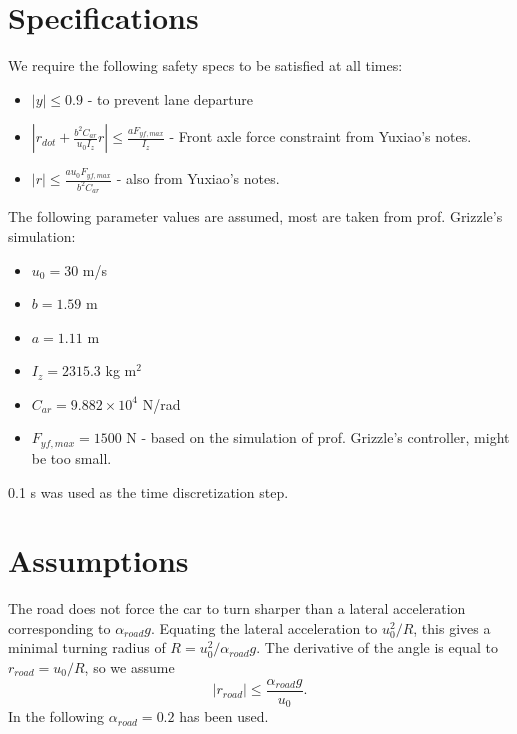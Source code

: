 \documentclass[letterpaper, 12pt]{article}
\begin{document}
\section{Specifications} %
\label{sec:specifications}

We require the following safety specs to be satisfied at all times:
\begin{itemize}
	\item $|y| \leq 0.9$ - to prevent lane departure
	\item $\left|r_{dot} + \frac{b^2 C_{ar}}{u_0 I_z} r \right|  \leq  \frac{a F_{yf,max}}{I_z}$ - Front axle force constraint from Yuxiao's notes.
	\item $| r | \leq \frac{a u_0 F_{yf,max} }{ b^2 C_{ar}}$ - also from Yuxiao's notes.
\end{itemize}

The following parameter values are assumed, most are taken from prof. Grizzle's simulation:
\begin{itemize}
	\item $u_0 = 30$ m/s
	\item $b = 1.59$ m
	\item $a = 1.11$ m
	\item $I_z = 2315.3$ kg m$^2$
	\item $C_{ar} = 9.882 \times 10^{4}$ N/rad
	\item $F_{yf,max} = 1500$ N - based on the simulation of prof. Grizzle's controller, might be too small.
\end{itemize}

0.1 s was used as the time discretization step.

\section{Assumptions} %
\label{sec:assumptions}

The road does not force the car to turn sharper than a lateral acceleration corresponding to $\alpha_{road} g$. Equating the lateral acceleration to $u_0^2/R$, this gives a minimal turning radius of $R = u_0^2/\alpha_{road} g$. The derivative of the angle is equal to $r_{road} = u_0/R$, so we assume
\begin{equation}
	|r_{road}| \leq \frac{ \alpha_{road} g}{ u_0}.
\end{equation}
In the following $\alpha_{road} = 0.2$ has been used.

\end{document}
